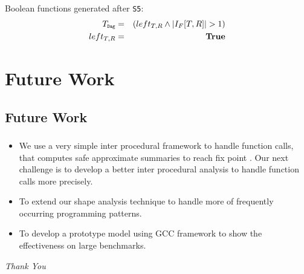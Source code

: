 \documentclass[mathserif,10pt]{beamer}
\newcommand{\num}[1]{\ensuremath{|#1|}}
\newcommand{\Dag}{{\tt Dag}}
\newcommand{\subD}{\mbox{\scalebox{0.6}{\Dag}}}
\newcommand{\true}{\textbf{True}}
\begin{document}
{{\begin{figure}
\centering
{}
\end{figure}

Boolean functions generated after {\tt S5}:
\begin{eqnarray*}
  T_{\subD} &=&   (left_{T,R} \wedge \num{I_F[T,R]} > 1) \\ 
  left_{T,R} &=& \true 
\end{eqnarray*}
}

\section{Future Work}
\subsection{Future Work}
\frame
{
	\frametitle{\subsecname}
	\begin{itemize}
	\item We use a very simple inter procedural framework to handle
function calls, that computes safe approximate summaries to
reach fix point .  Our next challenge is to develop a better
inter procedural analysis to handle function calls more
precisely. 
	\item To extend our shape analysis
technique to handle more of frequently occurring programming
patterns.
     \item To develop a prototype model using
GCC framework to show the effectiveness on large
benchmarks. 
	\end{itemize}
}

\begin{frame}[plain]

	\begin{center}
	\Huge{\emph{\blue Thank You }}
	\end{center}
\end{frame}
}
\end{document}
